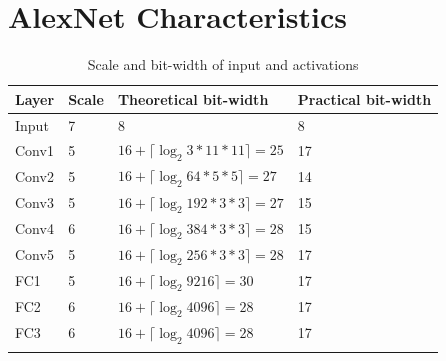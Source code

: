 \section{AlexNet Characteristics}
\begin{table}[H]
	\caption{Scale and bit-width of input and activations}
	\label{tab:scale-and-bit-width-of-input-and-activations}
	\centering
	\begin{tabular}{llll}
		\toprule
		\textbf{Layer} & \textbf{Scale} & \textbf{Theoretical bit-width} & \textbf{Practical bit-width}\\
		\midrule
			Input & 7 & 8 & 8\\
			Conv1 & 5 & $16 + \lceil \log_2 3 * 11 * 11 \rceil = 25 $ & 17\\
			Conv2 & 5 & $16 + \lceil \log_2 64 * 5 * 5 \rceil = 27$ & 14\\
			Conv3 & 5 & $16 + \lceil \log_2 192 * 3 * 3 \rceil = 27$ & 15\\
			Conv4 & 6 & $16 + \lceil \log_2 384 * 3 * 3 \rceil = 28$ & 15\\
			Conv5 & 5 & $16 + \lceil \log_2 256 * 3 * 3 \rceil = 28$ & 17\\
			FC1 & 5 & $16 + \lceil \log_2 9216 \rceil = 30$ & 17\\
			FC2 & 6 & $16 + \lceil \log_2 4096 \rceil = 28$ & 17\\
			FC3 & 6 & $16 + \lceil \log_2 4096 \rceil = 28$ & 17\\
		\bottomrule\\
	\end{tabular}
\end{table}

